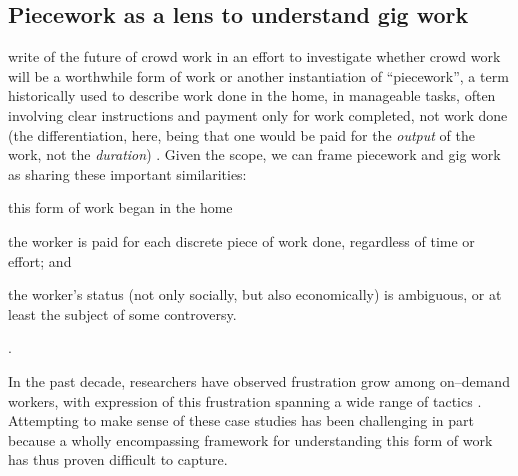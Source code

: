 \documentclass{sigchi}
\newcommand{\msb}[1]{{\color{PineGreen}[MSB: #1]}}
\newcommand{\ali}[1]{{\color{BrickRed}[\itshape al2: #1\upshape]}}
\begin{document}
\subsection{Piecework as a lens to understand gig work}

\citeauthor{crowdworkFuture}
write of the future of crowd work in an effort to investigate
whether crowd work will be a worthwhile form of work or another instantiation of ``piecework'',
a term historically used to describe work done in the home,
in manageable tasks,
often involving clear instructions
and payment only for work completed, not work done
(the differentiation, here, being that
one would be paid for the \textit{output} of the work,
not the \textit{duration})
\cite{crowdworkFuture}.
Given the scope,
we can frame piecework and gig work as sharing these important similarities:
\begin{inlinelist}
\item this form of work began in the home
\item the worker is paid for each discrete piece of work done, regardless of time or effort; and
\item the worker's status
(not only socially, but also economically)
is ambiguous, or at least the subject of some controversy.
\end{inlinelist}. 

In the past decade, researchers have observed frustration
grow among on--demand workers,
with expression of this frustration spanning a wide range of tactics
\cite{uberAlgorithm,turkopticon,dynamo}.
Attempting to make sense of these case studies has been challenging
in part because
a wholly encompassing framework for understanding this form of work
has thus proven difficult to capture.
\end{document}
